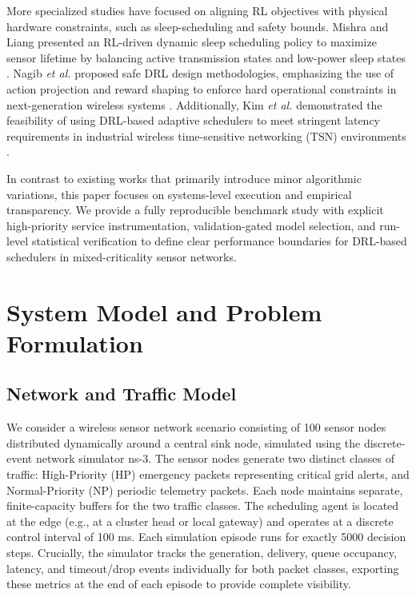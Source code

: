 \documentclass[runningheads,a4paper]{llncs}
\begin{document}
More specialized studies have focused on aligning RL objectives with physical hardware constraints, such as sleep-scheduling and safety bounds. Mishra and Liang presented an RL-driven dynamic sleep scheduling policy to maximize sensor lifetime by balancing active transmission states and low-power sleep states \cite{mishra2023sleep}. Nagib \textit{et al.} proposed safe DRL design methodologies, emphasizing the use of action projection and reward shaping to enforce hard operational constraints in next-generation wireless systems \cite{nagib2023safe}. Additionally, Kim \textit{et al.} demonstrated the feasibility of using DRL-based adaptive schedulers to meet stringent latency requirements in industrial wireless time-sensitive networking (TSN) environments \cite{kim2024wtsn}.

In contrast to existing works that primarily introduce minor algorithmic variations, this paper focuses on systems-level execution and empirical transparency. We provide a fully reproducible benchmark study with explicit high-priority service instrumentation, validation-gated model selection, and run-level statistical verification to define clear performance boundaries for DRL-based schedulers in mixed-criticality sensor networks.

\section{System Model and Problem Formulation}

\subsection{Network and Traffic Model}
We consider a wireless sensor network scenario consisting of 100 sensor nodes distributed dynamically around a central sink node, simulated using the discrete-event network simulator ns-3. The sensor nodes generate two distinct classes of traffic: High-Priority (HP) emergency packets representing critical grid alerts, and Normal-Priority (NP) periodic telemetry packets. Each node maintains separate, finite-capacity buffers for the two traffic classes. The scheduling agent is located at the edge (e.g., at a cluster head or local gateway) and operates at a discrete control interval of 100 ms. Each simulation episode runs for exactly 5000 decision steps. Crucially, the simulator tracks the generation, delivery, queue occupancy, latency, and timeout/drop events individually for both packet classes, exporting these metrics at the end of each episode to provide complete visibility.
\end{document}
